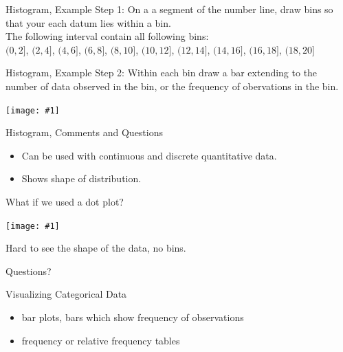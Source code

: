 \documentclass{beamer}
\newcommand{\qtns}[0]{\begin{center} Questions? \end{center}}
\newcommand{\nl}[1]{\vspace{#1 em}}
\newcommand{\cntrImg}[2]{\begin{center}\texttt{[image: \#1]}\end{center}}
\begin{document}
\begin{frame}{Histogram, Example}
    Step 1: On a a segment of the number line, draw bins so that your each datum lies within a bin. \\
    \nl{0.5}
    The following interval contain all following bins:\\ \nl{0.5}
    $(0,2]$,
    $(2,4]$,
    $(4,6]$,
    $(6,8]$,
    $(8,10]$,
    $(10,12]$,
    $(12,14]$,
    $(14,16]$,
    $(16,18]$,
    $(18,20]$
\end{frame}

\begin{frame}{Histogram, Example}
    Step 2: Within each bin draw a bar extending to the number of data observed in the bin, or the frequency of obervations in the bin.
    \cntrImg{ch01_power_hist.pdf}{0.4}
\end{frame}

\begin{frame}{Histogram, Comments and Questions}
    \begin{itemize}
        \item Can be used with continuous and discrete quantitative data.
        \item Shows shape of distribution.
    \end{itemize}
    What if we used a dot plot?
    \cntrImg{ch01_power_dot_stack.pdf}{0.5}
    Hard to see the shape of the data, no bins.
    \qtns
\end{frame}

\begin{frame}{Visualizing Categorical Data}
    \begin{itemize}
        \item bar plots, bars which show frequency of observations
        \item frequency or relative frequency tables
    \end{itemize}
\end{frame}
\end{document}
